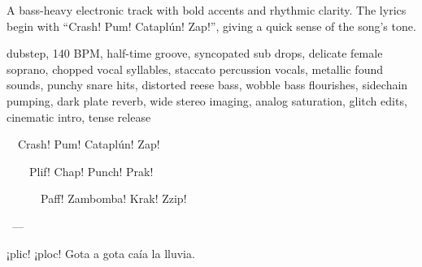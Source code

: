 

\begin{notes}
A bass-heavy electronic track with bold accents and rhythmic clarity. %
The lyrics begin with “Crash! Pum! Cataplún! Zap!”, giving a quick sense of the song’s tone.
\end{notes}

\begin{style}
dubstep, 140 BPM, half-time groove, syncopated sub drops, delicate female soprano, chopped vocal syllables, staccato percussion vocals, metallic found sounds, punchy snare hits, distorted reese bass, wobble bass flourishes, sidechain pumping, dark plate reverb, wide stereo imaging, analog saturation, glitch edits, cinematic intro, tense release
\end{style}

\begin{lyrics}

  Crash! Pum! Cataplún! Zap!

    Plif! Chap! Punch! Prak!

      Paff! Zambomba! Krak! Zzip!

 ---
 
¡plic! ¡ploc! Gota a gota caía la lluvia.

\end{lyrics}

